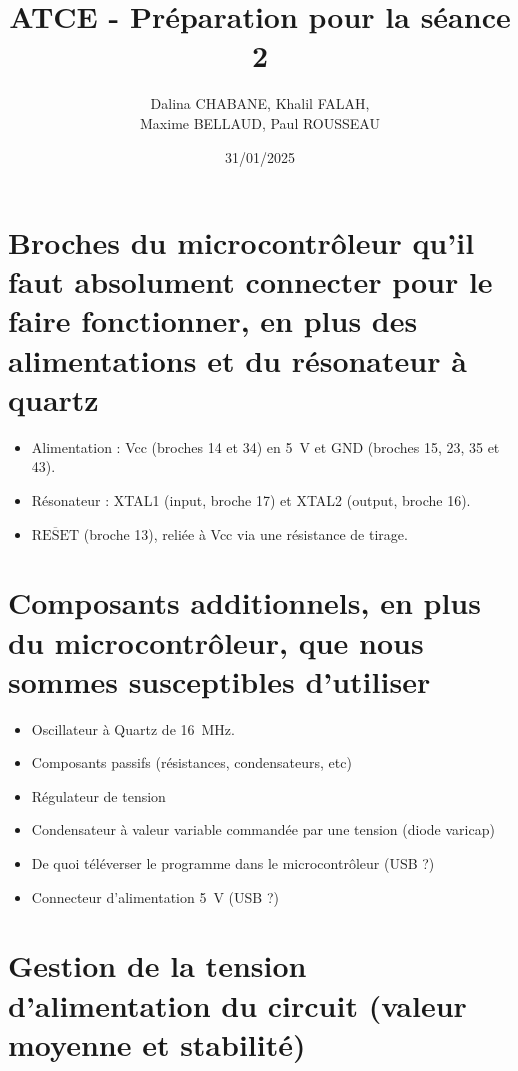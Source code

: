 \documentclass[12pt, a4paper]{article}
\title{ATCE - Préparation pour la séance 2}
\author{Dalina CHABANE, Khalil FALAH, \\ Maxime BELLAUD, Paul ROUSSEAU}
\date{31/01/2025}
\begin{document}
\maketitle

\section{\texorpdfstring{Broches du microcontrôleur qu'il faut absolument \linebreak connecter pour le faire fonctionner, en plus des \linebreak alimentations et du résonateur à quartz}{Broches du microcontrôleur qu'il faut absolument connecter pour le faire fonctionner, en plus des alimentations et du résonateur à quartz}}

\begin{itemize}
	\item Alimentation : Vcc (broches 14 et 34) en \SI{5}{\volt} et GND (broches 15, 23, 35 et 43).
	\item Résonateur : XTAL1 (input, broche 17) et XTAL2 (output, broche 16).
	\item $\overline{\text{RESET}}$ (broche 13), reliée à Vcc via une résistance de tirage.
\end{itemize}

\section{Composants additionnels, en plus du microcontrôleur, que nous sommes susceptibles d'utiliser}

\begin{itemize}
	\item Oscillateur à Quartz de \SI{16}{\mega\hertz}.
	\item Composants passifs (résistances, condensateurs, etc)
	\item Régulateur de tension
	\item Condensateur à valeur variable commandée par une tension (diode varicap)
	\item De quoi téléverser le programme dans le microcontrôleur (USB ?)
	\item Connecteur d'alimentation \SI{5}{\volt} (USB ?)
\end{itemize}

\section{Gestion de la tension d'alimentation du circuit (valeur moyenne et stabilité)}
\end{document}
